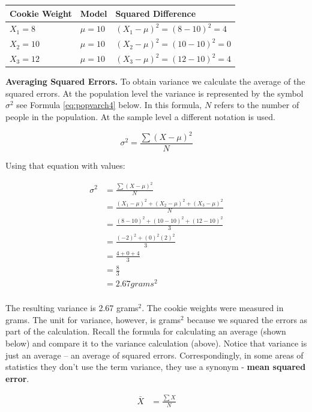 \documentclass[
]{krantz}
\begin{document}
\begin{longtable}[]{@{}lll@{}}
\toprule
Cookie Weight & Model & Squared Difference\tabularnewline
\midrule
\endhead
\(X_1 = 8\) & \(\mu = 10\) & \((X_1 - \mu)^2 =(8 - 10)^2= 4\)\tabularnewline
\(X_2 = 10\) & \(\mu = 10\) & \((X_2 - \mu)^2 =(10 - 10)^2= 0\)\tabularnewline
\(X_3 = 12\) & \(\mu = 10\) & \((X_3 - \mu)^2 =(12 - 10)^2= 4\)\tabularnewline
\bottomrule
\end{longtable}

\textbf{Averaging Squared Errors.} To obtain variance we calculate the average of the squared errors. At the population level the variance is represented by the symbol \(\sigma^2\) see Formula \eqref{eq:popvarch4} below. In this formula, \(N\) refers to the number of people in the population. At the sample level a different notation is used.

\begin{equation} 
\sigma^2 = \frac{\sum{(X - \mu)^2}}{N}
      \label{eq:popvarch4}
\end{equation}

Using that equation with values:

\[
\begin{aligned} 
\sigma^2 &= \frac{\sum{(X - \mu)^2}}{N}\\
&= \frac{(X_1-\mu)^2 + (X_2-\mu)^2 + (X_3-\mu)^2}{N}  \\ 
&= \frac{(8-10)^2 + (10-10)^2 + (12-10)^2}{3}\\
&= \frac{(-2)^2 + (0)^2 (2)^2}{3} \\
&= \frac{4 + 0 + 4}{3} \\
&= \frac{8}{3} \\
&= 2.67 grams^2 \\
\end{aligned} 
\]

The resulting variance is 2.67 grams\(^2\). The cookie weights were measured in grams. The unit for variance, however, is grams\(^2\) because we squared the errors as part of the calculation. Recall the formula for calculating an average (shown below) and compare it to the variance calculation (above). Notice that variance is just an average -- an average of squared errors. Correspondingly, in some areas of statistics they don't use the term variance, they use a synonym - \textbf{mean squared error}.

\[
\begin{aligned} 
\bar{X} &= \frac{\sum{X}}{N} \\
\end{aligned} 
\]
\end{document}

